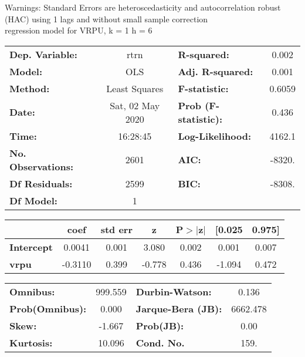 Warnings: \newline
 [1] Standard Errors are heteroscedasticity and autocorrelation robust (HAC) using 1 lags and without small sample correction\\ 

regression model for VRPU, k = 1 h = 6\begin{center}
\begin{tabular}{lclc}
\toprule
\textbf{Dep. Variable:}    &       rtrn       & \textbf{  R-squared:         } &     0.002   \\
\textbf{Model:}            &       OLS        & \textbf{  Adj. R-squared:    } &     0.001   \\
\textbf{Method:}           &  Least Squares   & \textbf{  F-statistic:       } &    0.6059   \\
\textbf{Date:}             & Sat, 02 May 2020 & \textbf{  Prob (F-statistic):} &    0.436    \\
\textbf{Time:}             &     16:28:45     & \textbf{  Log-Likelihood:    } &    4162.1   \\
\textbf{No. Observations:} &        2601      & \textbf{  AIC:               } &    -8320.   \\
\textbf{Df Residuals:}     &        2599      & \textbf{  BIC:               } &    -8308.   \\
\textbf{Df Model:}         &           1      & \textbf{                     } &             \\
\bottomrule
\end{tabular}
\begin{tabular}{lcccccc}
                   & \textbf{coef} & \textbf{std err} & \textbf{z} & \textbf{P$> |$z$|$} & \textbf{[0.025} & \textbf{0.975]}  \\
\midrule
\textbf{Intercept} &       0.0041  &        0.001     &     3.080  &         0.002        &        0.001    &        0.007     \\
\textbf{vrpu}      &      -0.3110  &        0.399     &    -0.778  &         0.436        &       -1.094    &        0.472     \\
\bottomrule
\end{tabular}
\begin{tabular}{lclc}
\textbf{Omnibus:}       & 999.559 & \textbf{  Durbin-Watson:     } &    0.136  \\
\textbf{Prob(Omnibus):} &   0.000 & \textbf{  Jarque-Bera (JB):  } & 6662.478  \\
\textbf{Skew:}          &  -1.667 & \textbf{  Prob(JB):          } &     0.00  \\
\textbf{Kurtosis:}      &  10.096 & \textbf{  Cond. No.          } &     159.  \\
\bottomrule
\end{tabular}
\end{center}

